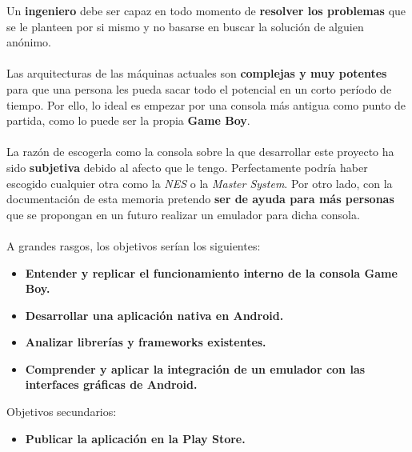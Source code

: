 Un \textbf{ingeniero} debe ser capaz en todo momento de \textbf{resolver los problemas} que se le planteen por si mismo y no basarse en buscar la solución de alguien anónimo.\\ \\
Las arquitecturas de las máquinas actuales son \textbf{complejas y muy potentes} para que una persona les pueda sacar todo el potencial en un corto período de tiempo. Por ello, lo ideal es empezar por una consola más antigua como punto de partida, como lo puede ser la propia \textbf{Game Boy}.\\ \\
La razón de escogerla como la consola sobre la que desarrollar este proyecto ha sido \textbf{subjetiva} debido al afecto que le tengo. Perfectamente podría haber escogido cualquier otra como la \textit{NES} o la \textit{Master System}. Por otro lado, con la documentación de esta memoria pretendo \textbf{ser de ayuda para más personas} que se propongan en un futuro realizar un emulador para dicha consola.\\ \\
A grandes rasgos, los objetivos serían los siguientes:\\
\begin{itemize}
    \item \textbf{Entender y replicar el funcionamiento interno de la consola Game Boy.}
    \item \textbf{Desarrollar una aplicación nativa en Android.}
    \item \textbf{Analizar librerías y frameworks existentes.}
    \item \textbf{Comprender y aplicar la integración de un emulador con las interfaces gráficas de Android.}
\end{itemize}

Objetivos secundarios:

\begin{itemize}
	\item \textbf{Publicar la aplicación en la Play Store.}
\end{itemize}

\cleardoublepage

